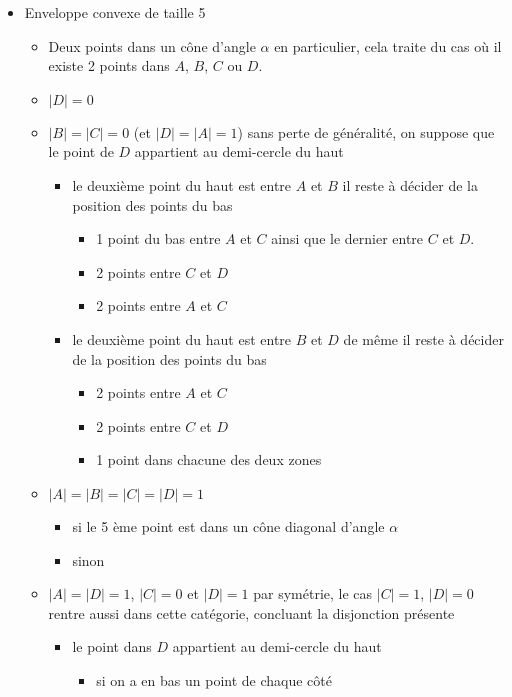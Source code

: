 \begin{itemize}
	\item Enveloppe convexe de taille 5
	\begin{itemize}
		\item Deux points dans un cône d'angle $\alpha$
		en particulier, cela traite du cas où il existe 2 points dans $A$, $B$, $C$ ou $D$.
		\item $|D| = 0$
		\item $|B| = |C| = 0$ (et $|D| = |A| = 1$)
		sans perte de généralité, on suppose que le point de $D$ appartient au demi-cercle du haut
		\begin{itemize}
			\item le deuxième point du haut est entre $A$ et $B$
			il reste à décider de la position des points du bas
			\begin{itemize}
				\item 1 point du bas entre $A$ et $C$ ainsi que le dernier entre $C$ et $D$.
				\item 2 points entre $C$ et $D$
				\item 2 points entre $A$ et $C$
			\end{itemize}
			\item le deuxième point du haut est entre $B$ et $D$
			de même il reste à décider de la position des points du bas
			\begin{itemize}
				\item 2 points entre $A$ et $C$
				\item 2 points entre $C$ et $D$
				\item 1 point dans chacune des deux zones
			\end{itemize}
		\end{itemize}
		\item $|A| = |B| = |C| = |D| = 1$
		\begin{itemize}
			\item si le 5 ème point est dans un cône diagonal d'angle $\alpha$
			\item sinon
		\end{itemize}
		\item $|A| = |D| = 1$, $|C| = 0$ et $|D| = 1$
		par symétrie, le cas $|C| = 1$, $|D| = 0$ rentre aussi dans cette catégorie, concluant la disjonction présente
		\begin{itemize}
			\item le point dans $D$ appartient au demi-cercle du haut
			\begin{itemize}
				\item si on a en bas un point de chaque côté

\end{itemize}
\end{itemize}
\end{itemize}
\end{itemize}
